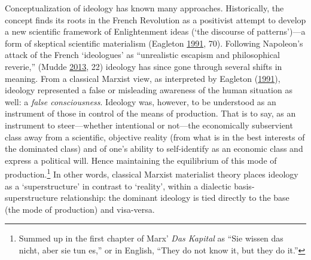 \documentclass[10pt,british,A4paper,oneside]{memoir}
\begin{document}
Conceptualization of ideology has known many approaches. Historically,
the concept finds its roots in the French Revolution as a positivist
attempt to develop a new scientific framework of Enlightenment ideas
(`the discourse of patterns')---a form of skeptical scientific
materialism (Eagleton
\protect\hyperlink{ref-eagleton_ideology:_1991}{1991}, 70). Following
Napoleon's attack of the French `ideologues' as ``unrealistic escapism
and philosophical reverie,'' (Mudde
\protect\hyperlink{ref-mudde_oxford_2013}{2013}, 22) ideology has since
gone through several shifts in meaning. From a classical Marxist view,
as interpreted by Eagleton
(\protect\hyperlink{ref-eagleton_ideology:_1991}{1991}), ideology
represented a false or misleading awareness of the human situation as
well: a \emph{false consciousness}. Ideology was, however, to be
understood as an instrument of those in control of the means of
production. That is to say, as an instrument to steer---whether
intentional or not---the economically subservient class away from a
scientific, objective reality (from what is in the best interests of the
dominated class) and of one's ability to self-identify as an economic
class and express a political will. Hence maintaining the equilibrium of
this mode of production.\footnote{Summed up in the first chapter of
  Marx' \emph{Das Kapital} as ``Sie wissen das nicht, aber sie tun es,''
  or in English, ``They do not know it, but they do it.''} In other
words, classical Marxist materialist theory places ideology as a
`superstructure' in contrast to `reality', within a dialectic
basis-superstructure relationship: the dominant ideology is tied
directly to the base (the mode of production) and visa-versa.
\end{document}
